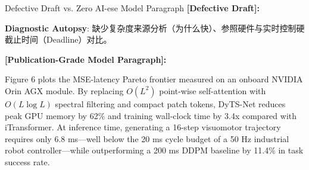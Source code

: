 \begin{ExampleBox}{Defective Draft vs. Zero AI-ese Model Paragraph}
\textbf{\color{TargetHighlight}[Defective Draft]:}\par
{}\par\vspace{4pt}
\textbf{Diagnostic Autopsy}: 缺少复杂度来源分析（为什么快）、参照硬件与实时控制硬截止时间（Deadline）对比。\par\vspace{6pt}
\textbf{\color{AcadNavy}[Publication-Grade Model Paragraph]:}\par
Figure 6 plots the MSE-latency Pareto frontier measured on an onboard NVIDIA Orin AGX module. By replacing $O(L^2)$ point-wise self-attention with $O(L \log L)$ spectral filtering and compact patch tokens, DyTS-Net reduces peak GPU memory by 62\% and training wall-clock time by 3.4x compared with iTransformer. At inference time, generating a 16-step visuomotor trajectory requires only 6.8 ms---well below the 20 ms cycle budget of a 50 Hz industrial robot controller---while outperforming a 200 ms DDPM baseline by 11.4\% in task success rate.
\end{ExampleBox}
